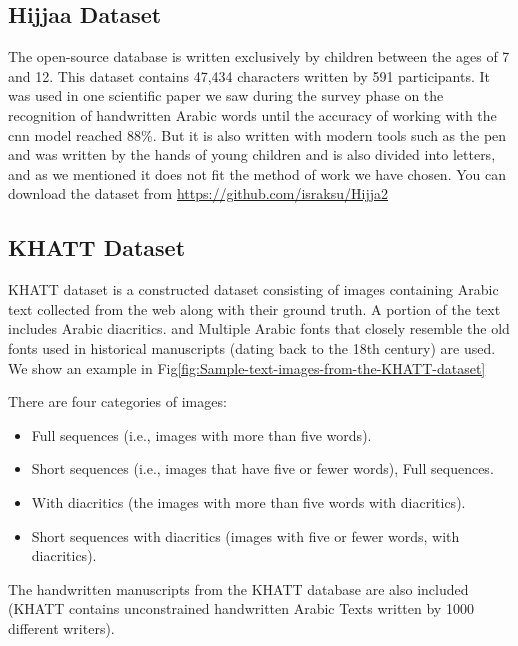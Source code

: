 \subsection{Hijjaa Dataset}
The open-source database is written exclusively by children between the ages of 7 and 12. This dataset contains 47,434 characters written by 591 participants. It was used in one scientific paper we saw during the survey phase on the recognition of handwritten Arabic words until the accuracy of working with the \acrshort{cnn} model reached 88\%.\cite{altwaijry2021arabic} But it is also written with modern tools such as the pen and was written by the hands of young children and is also divided into letters, and as we mentioned it does not fit the method of work we have chosen. You can download the dataset from \url{https://github.com/israksu/Hijja2}

\subsection{KHATT Dataset}
KHATT dataset \cite{KHATT} is a constructed dataset consisting of images containing Arabic text collected from the web along with their ground truth.
A portion of the text includes Arabic diacritics. and Multiple Arabic fonts that closely resemble the old fonts used in historical manuscripts (dating back to the 18th century) are used. We show an example in Fig\ref{fig:Sample-text-images-from-the-KHATT-dataset}

There are four categories of images:

\begin{itemize}[itemsep=1pt, topsep=5pt]
    \item Full sequences (i.e., images with more than five words).
    \item Short sequences (i.e., images that have five or fewer words), Full sequences.
    \item With diacritics (the images with more than five words with diacritics).
    \item Short sequences with diacritics (images with five or fewer words, with diacritics).
\end{itemize}  

The handwritten manuscripts from the KHATT database are also included (KHATT contains unconstrained handwritten Arabic Texts written by 1000 different writers).\cite{mostafa2021ocformer}

